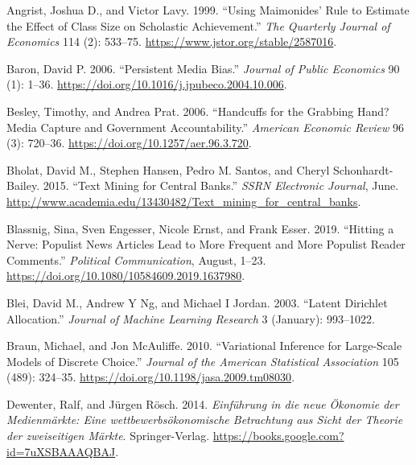 \documentclass[
  12pt,
]{article}
\newlength{\cslhangindent}
\newlength{\cslentryspacingunit} %
\newenvironment{CSLReferences}[2] %
 {%
  \setlength{\parindent}{0pt}
  \ifodd #1
  \let\oldpar\par
  \def\par{\hangindent=\cslhangindent\oldpar}
  \fi
  \setlength{\parskip}{#2\cslentryspacingunit}
 }%
 {}
\begin{document}
\hypertarget{refs}{}
\begin{CSLReferences}{1}{0}
\leavevmode{}%
Angrist, Joshua D., and Victor Lavy. 1999. {``Using {Maimonides}' {Rule}
to {Estimate} the {Effect} of {Class Size} on {Scholastic
Achievement}.''} \emph{The Quarterly Journal of Economics} 114 (2):
533--75. \url{https://www.jstor.org/stable/2587016}.

\leavevmode{}%
Baron, David P. 2006. {``Persistent Media Bias.''} \emph{Journal of
Public Economics} 90 (1): 1--36.
\url{https://doi.org/10.1016/j.jpubeco.2004.10.006}.

\leavevmode{}%
Besley, Timothy, and Andrea Prat. 2006. {``Handcuffs for the {Grabbing
Hand}? {Media Capture} and {Government Accountability}.''}
\emph{American Economic Review} 96 (3): 720--36.
\url{https://doi.org/10.1257/aer.96.3.720}.

\leavevmode{}%
Bholat, David M., Stephen Hansen, Pedro M. Santos, and Cheryl
Schonhardt-Bailey. 2015. {``Text {Mining} for {Central Banks}.''}
\emph{SSRN Electronic Journal}, June.
\url{http://www.academia.edu/13430482/Text_mining_for_central_banks}.

\leavevmode{}%
Blassnig, Sina, Sven Engesser, Nicole Ernst, and Frank Esser. 2019.
{``Hitting a {Nerve}: {Populist News Articles Lead} to {More Frequent}
and {More Populist Reader Comments}.''} \emph{Political Communication},
August, 1--23. \url{https://doi.org/10.1080/10584609.2019.1637980}.

\leavevmode{}%
Blei, David M., Andrew Y Ng, and Michael I Jordan. 2003. {``Latent
Dirichlet Allocation.''} \emph{Journal of Machine Learning Research} 3
(January): 993--1022.

\leavevmode{}%
Braun, Michael, and Jon McAuliffe. 2010. {``Variational Inference for
Large-Scale Models of Discrete Choice.''} \emph{Journal of the American
Statistical Association} 105 (489): 324--35.
\url{https://doi.org/10.1198/jasa.2009.tm08030}.

\leavevmode{}%
Dewenter, Ralf, and Jürgen Rösch. 2014. \emph{Einführung in die neue
Ökonomie der Medienmärkte: Eine wettbewerbsökonomische Betrachtung aus
Sicht der Theorie der zweiseitigen Märkte}. {Springer-Verlag}.
\url{https://books.google.com?id=7uXSBAAAQBAJ}.


\end{CSLReferences}
\end{document}
